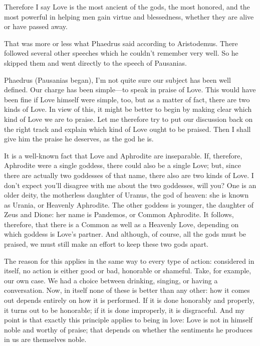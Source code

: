Therefore I say Love is the most ancient of the gods, the most honored,
and the most powerful in helping men gain virtue and blessedness,
whether they are alive or have passed away.

That was more or less what Phaedrus said according to Aristodemus.
 There followed several other speeches which he couldn't remember
very well. So he skipped them and went directly to the speech of
Pausanias.

\blank[line]

Phaedrus (Pausanias began), I'm not quite sure our subject has been well
defined. Our charge has been simple---to speak in praise of Love. This
would have been fine if Love himself were simple, too, but as a matter
of fact, there are two kinds of Love. In view of this, it might be
better to begin by making clear which kind of Love we are to praise. Let
me therefore  try to put our discussion back on the right track
and explain which kind of Love ought to be praised. Then I shall give
him the praise he deserves, as the god he is.

It is a well-known fact that Love and Aphrodite are inseparable. If,
therefore, Aphrodite were a single goddess, there could also be a single
Love; but, since there are actually two goddesses of that name, there
also are two kinds of Love. I don't expect you'll disagree with me about
the two goddesses, will you? One is an older deity, the motherless
daughter of Uranus, the god of heaven: she is known as Urania, or
Heavenly Aphrodite. The other goddess is younger, the daughter of Zeus
and Dione: her name is Pandemos, or Common Aphrodite. It follows,
therefore, that there  is a Common as well as a Heavenly Love,
depending on which goddess is Love's partner. And although, of course,
all the gods must be praised, we must still make an effort to keep these
two gods apart.

The reason for this applies in the same way to every type of action:
considered in itself, no action is either good or bad, honorable or
shameful.  Take, for example, our own case. We had a
choice between drinking, singing, or having a conversation. Now, in
itself none of these is better than any other: how it comes out depends
entirely on how it is performed. If it is done honorably and properly,
it turns out to be honorable; if it is done improperly, it is
disgraceful. And my point is that exactly this principle applies to
being in love: Love is not in himself noble and worthy of praise; that
depends on whether the sentiments he produces in us are themselves
noble.

